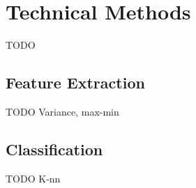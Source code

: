 \chapter{Technical Methods}
\label{sec:technical-methods}
TODO

\section{Feature Extraction}
\label{sec:feature-extraction}
TODO Variance, max-min

\section{Classification}
\label{sec:classification}
TODO K-nn
